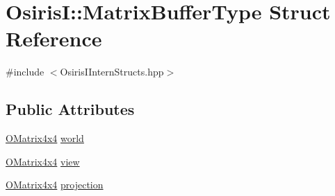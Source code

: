 \hypertarget{struct_osiris_i_1_1_matrix_buffer_type}{\section{Osiris\-I\-:\-:Matrix\-Buffer\-Type Struct Reference}
\label{struct_osiris_i_1_1_matrix_buffer_type}
}


{\ttfamily \#include $<$Osiris\-I\-Intern\-Structs.\-hpp$>$}

\subsection*{Public Attributes}
\begin{DoxyCompactItemize}
\item 
\hyperlink{struct_osiris_i_1_1_o_matrix4x4}{O\-Matrix4x4} \hyperlink{struct_osiris_i_1_1_matrix_buffer_type_aa0555ccdbe156b4ea24bac1ea1151e43}{world}
\item 
\hyperlink{struct_osiris_i_1_1_o_matrix4x4}{O\-Matrix4x4} \hyperlink{struct_osiris_i_1_1_matrix_buffer_type_aa768c418a4ff70da327bd736ecd413d3}{view}
\item 
\hyperlink{struct_osiris_i_1_1_o_matrix4x4}{O\-Matrix4x4} \hyperlink{struct_osiris_i_1_1_matrix_buffer_type_a33f994911364411fd5cfd7201b4be475}{projection}
\end{DoxyCompactItemize}


